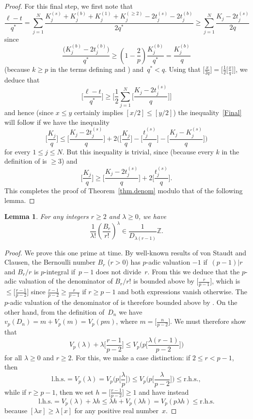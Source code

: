 \documentclass[pdftex]{sigma}
\numberwithin{equation}{section}
\newtheorem{Lemma}[Theorem]{Lemma}
\def\l{\lambda}
\def\l{\lambda}
\def\Z{\mathbb Z}
\def\m{ - }
\def\l{\lambda}
\def\be{\begin{equation}}
\def\ee{\end{equation}}
\begin{document}
\begin{proof}
For this final step, we first note that
\[
\frac{\ell-t}{q^*} = \sum_{j=1}^N
\frac{K_j^{(s)}+K_j^{(b)}+K_j^{(1)}+K_j^{(\ge2)}-2t_j^{(s)}-2t_j^{(b)}}{2q^*}
 \ge \sum_{j=1}^N\frac{K_j-2t_j^{(s)}}{2q}
\]
since
\[
\frac{\big(K_j^{(b)}-2t_j^{(b)}\big)}{q^*}\ge \left(1-\frac{2}{p}\right) \frac{K_j^{(b)}}{q^*}=\frac{K_j^{(b)}}{q}
\]
 \big(because $k\ge p$ in the terms defining  and \big) and~$q^*<q$.
Using that $\big[\frac x{2q}\big]=\big[\frac12\big[\frac xq\big]\big]$, we deduce that
\[
\biggl[\frac{\ell-t}{q^*}\biggr] \ge
\Biggl[\frac12\sum_{j=1}^N\Bigg[\frac{K_j-2t_j^{(s)}}{q}\Bigg]\Biggr]
\]
and hence (since $x\le y$ certainly implies $[x/2]\le[y/2]$) the
inequality~\eqref{Final} will follow if we have the inequality
\[
\biggl[\frac{K_j}q\biggr] \le \Bigg[\frac{K_j-2t_j^{(s)}}{q}\Bigg]
+ 2 \Bigg(\biggl[\frac{K_j}q\biggr] \m \Bigg[\frac{t_j^{(s)}}q\Bigg]
\m \Bigg[\frac{K_j-K_j^{(s)}}q\Bigg] \Bigg)
\]
for every $1\le j\le N$. But this inequality is trivial, since
 (because every $k$ in the
definition of  is $\ge3$) and
\[
\biggl[\frac{K_j}q\biggr]\ge\Bigg[\frac{K_j-2t_j^{(s)}}q\Bigg]
+2\Bigg[\frac{t_j^{(s)}}q\Bigg].
\]
 This completes the proof of Theorem~\ref{thm.denom} modulo that of the following lemma.
\end{proof}

\begin{Lemma}\label{LemmaB}
For any integers $r\ge2$ and $\l\ge0$, we have
\be
\label{BernEstimate}
\frac1{\l!} \left(\frac{B_r}{r!}\right)^\l \in \frac1{D_{\l(r-1)}} \Z .
\ee
\end{Lemma}

\begin{proof}
We prove this one prime at time. By well-known results of
von Staudt and Clausen, the Bernoulli number $B_r$ ($r>0$) has $p$-adic valuation
$-1$ if~${(p-1)|r}$ and $B_r/r$ is $p$-integral if~${p-1}$ does not divide~$r$. From this
we deduce that the $p$-adic valuation of the denominator of $B_r/r!$ is bounded
above by $\bigl[\frac r{p-1}\bigr]$, which is $\le\bigl[\frac {r-1}{p-2}\bigr]$
since $\frac{r-1}{p-2}\ge\frac r{p-1}$ if $r\ge p-1$ and both expressions
vanish otherwise. The $p$-adic valuation of the denominator of
\smash{$\frac1{\l!}\bigl(\frac{B_r}{r!}\bigr)^\l$} is therefore bounded above by
\smash{$V_p(\l)+\l\bigl[\frac{r-1}{p-2}\bigr]$}. On the other hand, from the definition
of~$D_n$ we have $v_p(D_n)=m+V_p(m)=V_p(pm)$, where $m=\bigl[\frac n{p-2}\bigr] $.
We must therefore show that
\[
V_p(\l)+\l \biggl[\frac{r-1}{p-2}\biggr] \le
V_p\biggl(p \biggr[\frac{\l(r-1)}{p-2}\biggr]\biggl)
\]
for all $\l\ge0$ and $r\ge2$. For this, we make a case distinction: if $ 2\le r<p-1$, then
\[
\text{l.h.s.} = V_p(\l) = V_p\biggl(p \biggl[\frac\l p\biggr]\biggr) \le
V_p\biggl(p \biggl[\frac\l{p-2}\biggr]\biggr) \le \text{r.h.s.} ,
\]
while if $r\ge p-1$, then we set $h=\bigl[\frac{r-1}{p-2}\bigr]\ge1$ and have
instead
\[
\text{l.h.s.} = V_p(\l)+\l h \le \l h+V_p(\l h) = V_p(p\l h) \le \text{r.h.s.}
\]
because $[\l x]\ge \l [x]$ for any positive real number~$x$.
\end{proof}
\end{document}
